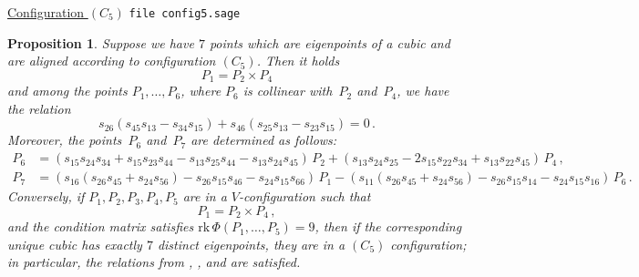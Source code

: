 \documentclass{amsart}
\theoremstyle{plain}
\newtheorem{prop}[lemma]{Proposition}
\theoremstyle{definition}
\newcommand{\rk}{\ensuremath{\mathrm{rk}}}
\begin{document}
\underline{Configuration $(C_5)$}
\verb+file config5.sage+
\begin{prop}
\label{proposition:condition_5}
Suppose we have $7$ points which are eigenpoints of a cubic and are
aligned according to configuration $(C_5)$.
Then it holds
%
\[
  P_1 = P_2 \times P_4 
\]
%
and among the points $P_1, \dots, P_6$, where $P_6$ is collinear with~$P_2$ and~$P_4$, we have the relation
%
\begin{equation}
\label{cndC5}
  s_{26}(s_{45}s_{13}-s_{34}s_{15})+s_{46}(s_{25}s_{13}-s_{23}s_{15}) = 0 \,.
\end{equation}
%
Moreover, the points~$P_6$ and~$P_7$ are determined as follows:
%
\begin{align}
  P_6 &= (s_{15}s_{24}s_{34}+s_{15}s_{23}s_{44} -s_{13}s_{25}s_{44} -s_{13}s_{24}s_{45}) \, P_2 + (s_{13}s_{24}s_{25}-2s_{15}s_{22}s_{34}+s_{13}s_{22}s_{45}) \, P_4 \,, \label{p6formula} \\
  P_7 &= (s_{16}(s_{26}s_{45}+s_{24}s_{56})-s_{26}s_{15}s_{46}-s_{24}s_{15}s_{66}) \, P_1-
  (s_{11}(s_{26}s_{45}+s_{24}s_{56})-s_{26}s_{15}s_{14}-s_{24}s_{15}s_{16}) \, P_6 \,.
  \label{p7formula}
\end{align}
%
Conversely, if $P_1, P_2, P_3, P_4, P_5$ are in a $V$-configuration such that
%
\[
  P_1 = P_2 \times P_4 \,,
\]
%
and the condition matrix satisfies
$\rk \, \Phi (P_1, \dots, P_5) = 9$, then if the corresponding unique cubic has exactly $7$ distinct eigenpoints, they are in a $(C_5)$ configuration; in particular, the relations from , , and  are satisfied.
\end{prop}
\end{document}

